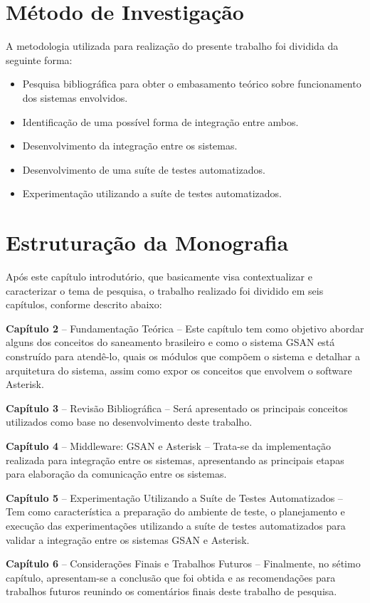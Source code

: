 \section*{Método de Investigação}
A metodologia utilizada para realização do presente trabalho foi dividida da seguinte forma:
\begin{itemize}
	\item Pesquisa bibliográfica para obter o embasamento teórico sobre funcionamento dos sistemas envolvidos.
	\item Identificação de uma possível forma de integração entre ambos.
	\item Desenvolvimento da integração entre os sistemas.
	\item Desenvolvimento de uma suíte de testes automatizados.
	\item Experimentação utilizando a suíte de testes automatizados.
\end{itemize}

\section*{Estruturação da Monografia}
	
Após este capítulo introdutório, que basicamente visa contextualizar e caracterizar o tema de pesquisa, o trabalho realizado foi dividido em seis capítulos, conforme descrito abaixo:
\begin{description}
	\item \textbf{Capítulo 2} – Fundamentação Teórica – Este capítulo tem como objetivo abordar alguns dos conceitos do saneamento brasileiro e como o sistema GSAN está construído para atendê-lo, quais os módulos que compõem o sistema e detalhar a arquitetura do sistema, assim como expor os conceitos que envolvem o software Asterisk.
	\item \textbf{Capítulo 3 } – Revisão Bibliográfica – Será apresentado os principais conceitos utilizados como base no desenvolvimento deste trabalho.
	\item \textbf{Capítulo  4} – Middleware: GSAN e Asterisk – Trata-se da implementação realizada para integração entre os sistemas, apresentando as principais etapas para elaboração da comunicação entre os sistemas.
	\item \textbf{Capítulo  5} – Experimentação Utilizando a Suíte de Testes Automatizados – Tem como característica a preparação do ambiente de teste, o planejamento e execução das experimentações utilizando a suíte de testes automatizados para validar a integração entre os sistemas GSAN e Asterisk.
	\item \textbf{Capítulo 6} – Considerações Finais e Trabalhos Futuros – Finalmente, no sétimo capítulo, apresentam-se a conclusão que foi obtida e as recomendações para trabalhos futuros reunindo os comentários finais deste trabalho de pesquisa.	
\end{description}
	

